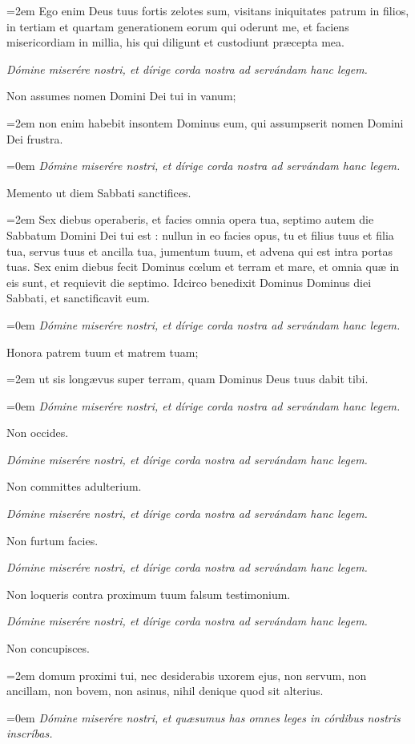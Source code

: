     \par\noindent
    \leftskip=2em
	{\small{Ego enim Deus tuus fortis zelotes sum, visitans iniquitates patrum in filios, in tertiam et quartam generationem eorum qui oderunt me, et faciens misericordiam in millia, his qui diligunt et custodiunt præcepta mea.}}
	\par
	\leftskip=0cm
    \textit{Dómine miserére nostri, et dírige corda nostra ad servándam hanc legem.}
    \par\noindent
    Non assumes nomen Domini Dei tui in vanum;
    \par\noindent
    \leftskip=2em
	{\small{non enim habebit insontem Dominus eum, qui assumpserit nomen Domini Dei frustra.}}
	\par
	\leftskip=0em
    \textit{Dómine miserére nostri, et dírige corda nostra ad servándam hanc legem.}
    \par\noindent
    Memento ut diem Sabbati sanctifices.
    \par\noindent
    \leftskip=2em
	{\small{Sex diebus operaberis, et facies omnia opera tua, septimo autem die Sabbatum Domini Dei tui est : nullun in eo facies opus, tu et filius tuus et filia tua, servus tuus et ancilla tua, jumentum tuum, et advena qui est intra portas tuas. Sex enim diebus fecit Dominus cœlum et terram et mare, et omnia quæ in eis sunt, et requievit die septimo. Idcirco benedixit Dominus Dominus diei Sabbati, et sanctificavit eum.}}
	\par
	\leftskip=0em
    \textit{Dómine miserére nostri, et dírige corda nostra ad servándam hanc legem.}
    \par\noindent
    Honora patrem tuum et matrem tuam;
    \par\noindent
    \leftskip=2em
	{\small{ut sis longævus super terram, quam Dominus Deus tuus dabit tibi.}}
	\par
	\leftskip=0em
    \textit{Dómine miserére nostri, et dírige corda nostra ad servándam hanc legem.}
    \par\noindent
    Non occides.\par
    \textit{Dómine miserére nostri, et dírige corda nostra ad servándam hanc legem.}
    \par\noindent
    Non committes adulterium.\par
    \textit{Dómine miserére nostri, et dírige corda nostra ad servándam hanc legem.}
\par\noindent
    Non furtum facies.\par
    \textit{Dómine miserére nostri, et dírige corda nostra ad servándam hanc legem.}
\par\noindent
    Non loqueris contra proximum tuum falsum testimonium.\par
    \textit{Dómine miserére nostri, et dírige corda nostra ad servándam hanc legem.}
    \par\noindent
    Non concupisces.
    \par\noindent
    \leftskip=2em
	{\small{domum proximi tui, nec desiderabis uxorem ejus, non servum, non ancillam, non bovem, non asinus, nihil denique quod sit alterius.}}
	\par
	\leftskip=0em
	\textit{Dómine miserére nostri, et qu{\ae}sumus has omnes leges in córdibus nostris inscríbas.}
	

